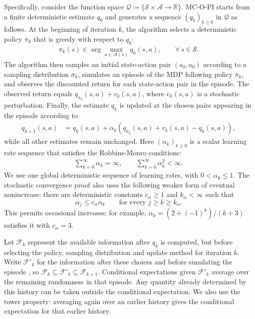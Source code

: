 \documentclass[twoside,11pt]{article}
\newcommand{\qset}{\mathcal{Q}}
\newcommand{\aset}{\mathcal{A}}
\newcommand{\sset}{\mathcal{S}}
\newcommand{\pol}{\pi}
\newcommand{\start}{\sigma}
\newcommand{\lrate}{\alpha}
\DeclareRobustCommand{\reviewbarstart}{%
  \ifhmode %
    \vadjust{\vbox to 0pt{%
      \vskip-\ht\strutbox %
      \vskip-\dp\strutbox %
      \cbstart[\changebarwidth] %
      \vss %
    }}%
  \else %
    \cbstart[\changebarwidth]%
  \fi %
} %
\providecommand{\DIFadd}[1]{#1} %
\providecommand{\DIFaddbegin}{\reviewbarstart} %
\providecommand{\DIFaddend}{\protect\cbend} %
\def\DIFadd#1{#1}%
\def\DIFaddbegin{}%
\def\DIFaddend{}%
\begin{document}
Specifically, consider the function space $\qset \coloneqq \{ \mathcal S \times \mathcal A \to \mathbb R \}$.
MC-O-PI \DIFaddbegin \DIFadd{starts from a finite deterministic estimate $q_0$ and }\DIFaddend generates a sequence $(q_k)_{k \ge 0}$ in $\qset$ as follows.
At the beginning of iteration $k$, the algorithm selects a deterministic policy $\pi_k$ that is greedy with respect to $q_k$:
\begin{align}
\label{eq: greedy policy definition}
    \pol_k(s) \in \arg\max_{a \in \aset(s)} q_k(s,a),
    \qquad \forall \, s \in \sset .
\end{align}
The algorithm then samples an initial state-action pair $(s_0, a_0)$ according to a sampling distribution $\start_k$,
simulates an episode of the MDP following policy $\pol_k$, and observes the discounted return for each state-action pair in the episode.
The observed return equals $q_{\pi_k}(s,a) + v_k(s,a)$, where $v_k(s,a)$ is a stochastic perturbation.
Finally, the estimate $q_k$ is updated at \DIFaddbegin \DIFadd{the chosen }\DIFaddend pairs appearing in the episode
according to
 \DIFaddbegin \begin{align}
\DIFadd{\label{eq: MC eval update}
    q_{k+1}(s, a)
    }&\DIFadd{= q_k(s,a) +  \lrate_k( q_{\pol_k}(s, a) + v_k(s, a) - q_k(s,a) ) ,
}\end{align}\DIFaddend 
 \DIFaddbegin \DIFadd{while all other estimates remain unchanged. Here }\DIFaddend $(\lrate_k)_{k \ge 0}$ is a scalar learning rate sequence that satisfies the Robbins-Monro conditions:
 \DIFaddbegin \begin{align}
 \DIFadd{\label{eq: robbins monro conditions}
    \sum_{k =0}^\infty \alpha_k = \infty ,
    \qquad
    \sum_{k =0}^\infty \alpha_k^2 < \infty .
}\end{align}\DIFaddend 
\DIFaddbegin \DIFadd{We use one global deterministic sequence of learning rates, with $0<\alpha_k\le1$. The stochastic convergence proof also uses the following weaker form of eventual nonincrease: there are deterministic constants $c_\alpha\ge1$ and $k_\alpha<\infty$ such that
}\begin{equation}
\DIFadd{\label{eq:comparison}
\alpha_j\le c_\alpha\alpha_k\qquad\text{for every }j\ge k\ge k_\alpha.
}\end{equation}
\DIFadd{This permits occasional increases; for example, $\alpha_k=(2+(-1)^k)/(k+3)$ satisfies it with $c_\alpha=3$.
}\DIFaddend 

Let $\mathcal F_k$ represent the available information after $q_k$ is computed, but before selecting the  policy, sampling  \DIFaddbegin \DIFadd{distribution and update method for iteration $k$.
Write $\mathcal F'_k$ for the information after these choices and before }\DIFaddend simulating the episode \DIFaddbegin \DIFadd{, so $\mathcal F_k\subseteq\mathcal F'_k\subseteq\mathcal F_{k+1}$.
Conditional expectations given $\mathcal F'_k$ average over the remaining randomness in that episode. Any quantity already determined by this history can be taken outside the conditional expectation. We also use the tower property: averaging again over an earlier history gives the conditional expectation for that earlier history.
}\DIFaddend 
\end{document}
